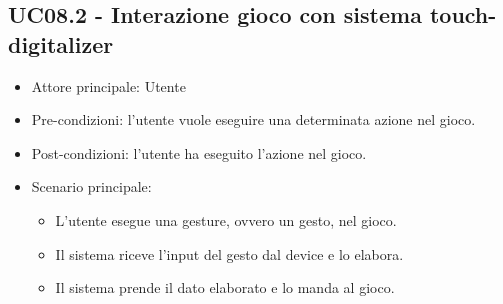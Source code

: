 \subsection{UC08.2 - Interazione gioco con sistema touch-digitalizer}
\begin{itemize}
    \item Attore principale: Utente
    \item Pre-condizioni: l'utente vuole eseguire una determinata azione nel gioco.
    \item Post-condizioni: l'utente ha eseguito l'azione nel gioco.
    \item Scenario principale: \begin{itemize}
        \item L'utente esegue una gesture, ovvero un gesto, nel gioco.
        \item Il sistema riceve l'input del gesto dal device e lo elabora.
        \item Il sistema prende il dato elaborato e lo manda al gioco.
    \end{itemize}
\end{itemize}

